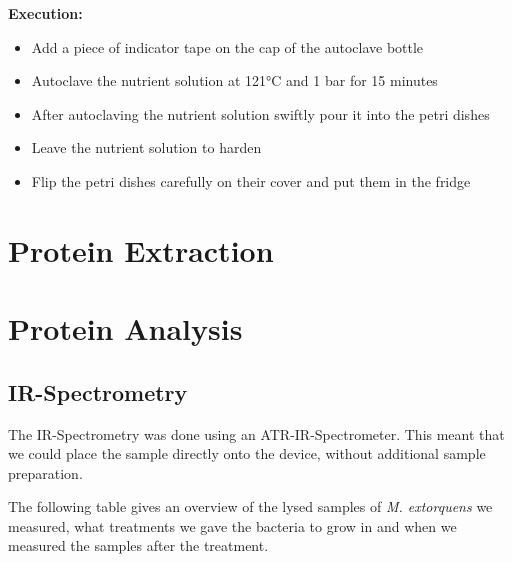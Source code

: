 \textbf{Execution:}

\begin{itemize}
    \item Add a piece of indicator tape on the cap of the autoclave bottle
    \item Autoclave the nutrient solution at 121°C and 1 bar for 15 minutes
    \item After autoclaving the nutrient solution swiftly pour it into the petri dishes
    \item Leave the nutrient solution to harden
    \item Flip the petri dishes carefully on their cover and put them in the fridge
\end{itemize}


\section{Protein Extraction\authorB}


\section{Protein Analysis\authorA}

\subsection{IR-Spectrometry}

The IR-Spectrometry was done using an ATR-IR-Spectrometer.
This meant that we could place the sample directly onto the device, without additional sample preparation.

The following table gives an overview of the lysed samples of \emph{M. extorquens} we measured, what treatments we gave the bacteria to grow in and when we measured the samples after the treatment.

